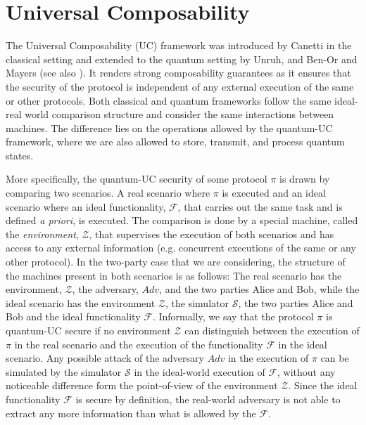 \section{Universal Composability}

The Universal Composability (UC) framework was introduced by Canetti \cite{C20} in the classical setting and extended to the quantum setting by Unruh, and Ben-Or and Mayers \cite{Unruh04, BenOrMay04}(see also \cite{Unruh10, FS09}).  It renders strong composability guarantees as it ensures that the security of the protocol is independent of any external execution of the same or other protocols.  Both classical and quantum frameworks follow the same ideal-real world comparison structure and consider the same interactions between machines. The difference lies on the operations allowed by the quantum-UC framework, where  we are also allowed to store, transmit, and process  quantum states. 

More specifically, the quantum-UC security of some protocol $\mathcal{\pi}$ is drawn by comparing two scenarios. A real scenario where  $\mathcal{\pi}$ is executed and an ideal scenario where an ideal functionality, $\mathcal{F}$,  that carries out the same task and is defined \textit{a priori}, is executed. The comparison is done by a special machine, called the \textit{environment}, $\mathcal{Z}$, that supervises the execution of both scenarios and has access to any external information (e.g. concurrent executions of the same or any other protocol). In the two-party case that we are considering, the structure of the machines present in both scenarios is as follows: The real scenario has the environment, $\mathcal{Z}$, the adversary, $Adv$, and the two parties Alice  and Bob, while the ideal scenario has the environment $\mathcal{Z}$, the simulator $\mathcal{S}$, the two parties Alice and Bob and the ideal functionality $\mathcal{F}$. 
Informally, we say that the protocol $\mathcal{\pi}$ is quantum-UC secure if no environment $\mathcal{Z}$ can distinguish between the execution of $\mathcal{\pi}$ in the real scenario and  the execution of the  functionality $\mathcal{F}$ in the ideal scenario. Any possible attack of the adversary $Adv$ in the execution of $\mathcal{\pi}$ can be simulated by the simulator $\mathcal{S}$ in the ideal-world execution of $\mathcal{F}$, without any noticeable difference form the point-of-view of the environment $\mathcal{Z}$. Since the ideal functionality $\mathcal{F}$ is secure by definition, the real-world adversary is not able to extract any more information than what is allowed by the  $\mathcal{F}$. %

